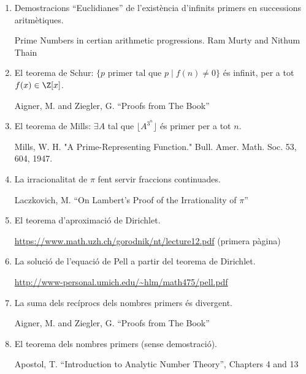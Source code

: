 
\begin{enumerate}

\item Demostracions ``Euclidianes'' de l'existència d'infinits primers en successions aritmètiques.

  {\tiny Prime Numbers in certian arithmetic progressions. Ram Murty and Nithum Thain}

\item El teorema de Schur: $\{p\text{ primer tal que } p \mid f(n)\neq 0\}$ és infinit, per a tot $f(x)\in\Z[x]$.

  {\tiny Aigner, M. and Ziegler, G. ``Proofs from The Book''}

\item El teorema de Mills: $\exists A$ tal que $\lfloor A^{3^n}\rfloor$ és primer per a tot $n$.

  {\tiny Mills, W. H. "A Prime-Representing Function." Bull. Amer. Math. Soc. 53, 604, 1947.}
\item La irracionalitat de $\pi$ fent servir fraccions continuades.

  {\tiny Laczkovich, M. ``On Lambert's Proof of the Irrationality of $\pi$''}

 \item El teorema d'aproximació de Dirichlet.

   {\tiny \url{https://www.math.uzh.ch/gorodnik/nt/lecture12.pdf} (primera pàgina)}
   
 \item La solució de l'equació de Pell a partir del teorema de Dirichlet.
 
 {\tiny \url{http://www-personal.umich.edu/~hlm/math475/pell.pdf}}
 
\item La suma dels recíprocs dels nombres primers és divergent.

  {\tiny Aigner, M. and Ziegler, G. ``Proofs from The Book''}

\item El teorema dels nombres primers (sense demostració).

  {\tiny Apostol, T. ``Introduction to Analytic Number Theory'', Chapters 4 and 13}


\end{enumerate}
